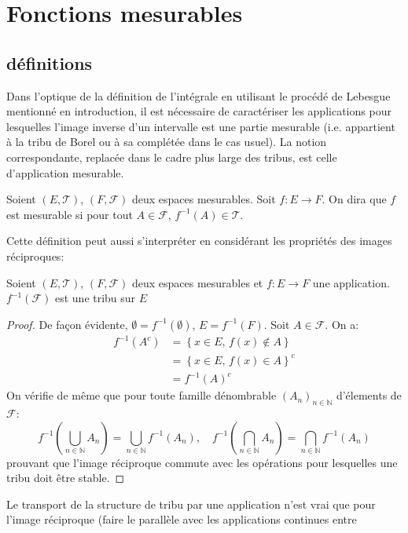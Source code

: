 \chapter{Fonctions mesurables}
\section{définitions}
Dans l'optique de la définition de l'intégrale en utilisant le procédé de
Lebesgue mentionné en introduction, il est nécessaire de caractériser les
applications pour lesquelles l'image inverse d'un intervalle est une partie
mesurable (i.e. appartient à la tribu de Borel ou à sa complétée dans le cas usuel). La
notion correspondante, replacée dans le cadre plus large des tribus, est
celle d'application mesurable.
\begin{mandatory}
\begin{defn}
Soient $(E, \mathcal{T})$, $(F, \mathcal{F})$ deux espaces mesurables. Soit $f : E \to F$. On dira que $f$ est mesurable si 
pour tout $A \in \mathcal{F}$, $f^{-1}(A) \in \mathcal{T}$.
\end{defn}
\end{mandatory}
Cette définition peut aussi s'interpréter en considérant les propriétés des
images réciproques:
\begin{prop}
Soient $(E, \mathcal{T})$, $(F, \mathcal{F})$ deux espaces mesurables et $f :
E \to F$ une application. $f^{-1}\left( \mathcal{F} \right)$ est une
tribu sur $E$
\end{prop}
\begin{proof}
De façon évidente, $\emptyset = f^{-1}(\emptyset)$, $E=f^{-1}(F)$. Soit $A \in
\mathcal{F}$. On a:
\begin{align*}
f^{-1}(A^c) & = \left \{ x \in E, \, f(x) \notin A \right \} \\
& = \left \{ x \in E, \, f(x) \in A \right \}^c \\
& = f^{-1}(A)^c
\end{align*}
On vérifie de m\^eme que pour toute famille dénombrable $(A_n)_{n \in
\mathbb{N}}$ d'élements de $\mathcal{F}$:
\[
f^{-1}\left(\bigcup_{n \in \mathbb{N}} A_n\right) = \bigcup_{n \in \mathbb{N}}
f^{-1}\left(A_n\right), \quad f^{-1}\left(\bigcap_{n \in \mathbb{N}} A_n\right)
=
\bigcap_{n \in \mathbb{N}} f^{-1}\left(A_n\right)\]
prouvant que l'image réciproque commute avec les opérations pour lesquelles une
tribu doit \^etre stable. 
\end{proof}
Le transport de la structure de tribu par une application n'est vrai que pour
l'image réciproque (faire le parallèle avec les applications continues entre
